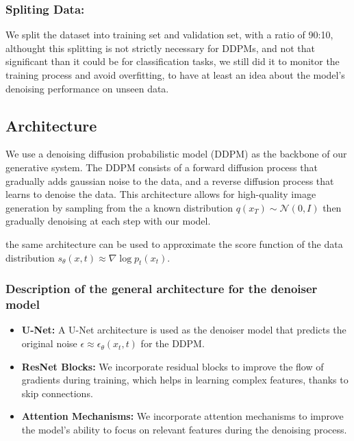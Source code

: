 \documentclass[twocolumn,superscriptaddress,aps]{revtex4-1}
\begin{document}
\subsubsection{Spliting Data:}\label{split_data}
We split the dataset into training set and validation set, with a ratio of 90:10, althought this splitting is not strictly necessary for DDPMs, and not that significant than it could be for classification tasks, we still did it to monitor the training process and avoid overfitting, to have at least an idea about the model's denoising performance on unseen data.

\subsection{Architecture}
We use a denoising diffusion probabilistic model (DDPM) as the backbone of our generative system. The DDPM consists of a forward diffusion process that gradually adds gaussian noise to the data, and a reverse diffusion process that learns to denoise the data. This architecture allows for high-quality image generation by sampling from the a known distribution $q(x_T) \sim \mathcal{N}(0, I)$ then gradually denoising at each step with our model.

the same architecture can be used to approximate the score function of the data distribution $s_\theta(x , t) \approx \nabla \log p_t(x_t)$.

\subsubsection{Description of the general architecture for the denoiser model}

\begin{itemize}
	\item \textbf{U-Net:} A U-Net architecture is used as the denoiser model that predicts the original noise $\epsilon \approx\epsilon_\theta(x_t, t)$ for the DDPM.
	\item \textbf{ResNet Blocks:} We incorporate residual blocks to improve the flow of gradients during training, which helps in learning complex features, thanks to skip connections.
	\item \textbf{Attention Mechanisms:} We incorporate attention mechanisms to improve the model's ability to focus on relevant features during the denoising process.
\end{itemize}
\end{document}

